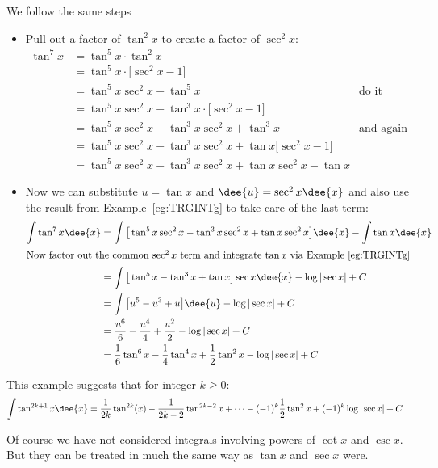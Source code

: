 \begin{eg}
\soln We follow the same steps
\begin{itemize}
 \item Pull out a factor of $\tan^2x$ to create a factor of $\sec^2x$:
\begin{align*}
\tan^7x &= \tan^5x \cdot \tan^2x \\
  &= \tan^5x \cdot \big[ \sec^2x - 1\big]\\
  &= \tan^5x \sec^2x - \tan^5x & \text{do it again}\\
  &= \tan^5x \sec^2x - \tan^3x \cdot \big[ \sec^2x - 1\big]\\
  &= \tan^5x \sec^2x - \tan^3x \sec^2x + \tan^3x &\text{and again}\\
  &= \tan^5x \sec^2x - \tan^3x \sec^2x + \tan x \big[ \sec^2x - 1\big]\\
  &= \tan^5x \sec^2x - \tan^3x \sec^2x + \tan x \sec^2x - \tan x
\end{align*}
\item Now we can substitute $u=\tan x$ and $\dee{u}=\sec^2x \dee{x}$ and also use the
result from Example~\ref{eg:TRGINTg} to take care of the last term:
\begin{align*}
  \int \tan^7x\dee{x}
&= \int \big[\tan^5x \sec^2x - \tan^3x \sec^2x + \tan x \sec^2x\big] \dee{x} - \int \tan
x \dee{x} \\
\intertext{Now factor out the common $\sec^2x$ term and integrate $\tan x$ via
Example~\ref{eg:TRGINTg}}
&= \int \big[ \tan^5x - \tan^3x +\tan x\big]\sec x\dee{x} - \log|\sec x| +C \\
&= \int \big[ u^5 - u^3 + u \big]\dee{u} - \log|\sec x| +C \\
&= \frac{u^6}{6} - \frac{u^4}{4} + \frac{u^2}{2} - \log|\sec x| +C \\
&= \frac{1}{6}\tan^6x - \frac{1}{4}\tan^4x +\frac{1}{2}\tan^2x - \log|\sec x| +
C
\end{align*}
\end{itemize}
This example suggests that for integer $k\geq 0$:
\begin{align*}
  \int \tan^{2k+1}x \dee{x}
&= \frac{1}{2k}\tan^{2k}(x) - \frac{1}{2k-2}\tan^{2k-2}x +
\cdots - (-1)^k \frac{1}{2} \tan^2 x + (-1)^k \log|\sec x| +C
\end{align*}

\end{eg}

Of course we have not considered integrals involving powers of $\cot x$ and $\csc x$.
But they can be treated in much the same way as $\tan x$ and $\sec x$ were.

